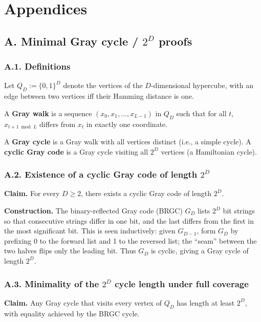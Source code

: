 \documentclass[12pt,a4paper]{article}
\theoremstyle{definition}
\theoremstyle{remark}
\begin{document}
\section*{Appendices}

\subsection*{A. Minimal Gray cycle / \(2^D\) proofs}

\subsubsection*{A.1. Definitions}

Let \(Q_D := \{0,1\}^D\) denote the vertices of the \(D\)-dimensional hypercube, with an edge between two vertices iff their Hamming distance is one.

A \textbf{Gray walk} is a sequence \((x_0, x_1, \ldots, x_{L-1})\) in \(Q_D\) such that for all \(t\), \(x_{t+1 \bmod L}\) differs from \(x_t\) in exactly one coordinate.

A \textbf{Gray cycle} is a Gray walk with all vertices distinct (i.e., a simple cycle). A \textbf{cyclic Gray code} is a Gray cycle visiting all \(2^D\) vertices (a Hamiltonian cycle).

\subsubsection*{A.2. Existence of a cyclic Gray code of length \(2^D\)}

\textbf{Claim.} For every \(D \geq 2\), there exists a cyclic Gray code of length \(2^D\).

\textbf{Construction.} The binary-reflected Gray code (BRGC) \(G_D\) lists \(2^D\) bit strings so that consecutive strings differ in one bit, and the last differs from the first in the most significant bit. This is seen inductively: given \(G_{D-1}\), form \(G_D\) by prefixing 0 to the forward list and 1 to the reversed list; the ``seam'' between the two halves flips only the leading bit. Thus \(G_D\) is cyclic, giving a Gray cycle of length \(2^D\).

\subsubsection*{A.3. Minimality of the \(2^D\) cycle length under full coverage}

\textbf{Claim.} Any Gray cycle that visits every vertex of \(Q_D\) has length at least \(2^D\), with equality achieved by the BRGC cycle.
\end{document}
